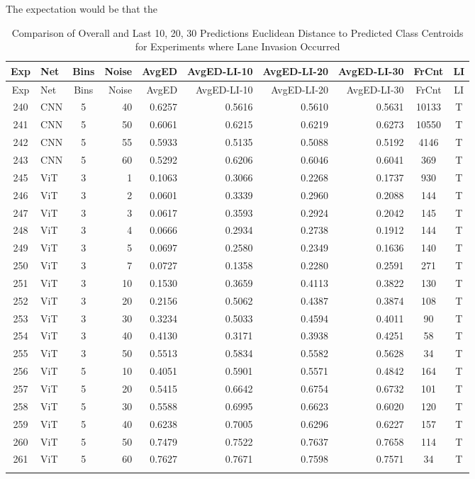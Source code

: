 The expectation would be that the



\begin{longtable}{@{}clcrrrrrcc@{}}
\toprule
Exp & Net & Bins & Noise & AvgED & AvgED-LI-10 & AvgED-LI-20 & AvgED-LI-30 & FrCnt & LI \\
\midrule
\endfirsthead
\toprule
Exp & Net & Bins & Noise & AvgED & AvgED-LI-10 & AvgED-LI-20 & AvgED-LI-30 & FrCnt & LI \\
\midrule
\endhead
240 & CNN & 5 & 40 & 0.6257 & 0.5616 & 0.5610 & 0.5631 & 10133 & T \\
241 & CNN & 5 & 50 & 0.6061 & 0.6215 & 0.6219 & 0.6273 & 10550 & T \\
242 & CNN & 5 & 55 & 0.5933 & 0.5135 & 0.5088 & 0.5192 & 4146 & T \\
243 & CNN & 5 & 60 & 0.5292 & 0.6206 & 0.6046 & 0.6041 & 369 & T \\
245 & ViT & 3 & 1 & 0.1063 & 0.3066 & 0.2268 & 0.1737 & 930 & T \\
246 & ViT & 3 & 2 & 0.0601 & 0.3339 & 0.2960 & 0.2088 & 144 & T \\
247 & ViT & 3 & 3 & 0.0617 & 0.3593 & 0.2924 & 0.2042 & 145 & T \\
248 & ViT & 3 & 4 & 0.0666 & 0.2934 & 0.2738 & 0.1912 & 144 & T \\
249 & ViT & 3 & 5 & 0.0697 & 0.2580 & 0.2349 & 0.1636 & 140 & T \\
250 & ViT & 3 & 7 & 0.0727 & 0.1358 & 0.2280 & 0.2591 & 271 & T \\
251 & ViT & 3 & 10 & 0.1530 & 0.3659 & 0.4113 & 0.3822 & 130 & T \\
252 & ViT & 3 & 20 & 0.2156 & 0.5062 & 0.4387 & 0.3874 & 108 & T \\
253 & ViT & 3 & 30 & 0.3234 & 0.5033 & 0.4594 & 0.4011 & 90 & T \\
254 & ViT & 3 & 40 & 0.4130 & 0.3171 & 0.3938 & 0.4251 & 58 & T \\
255 & ViT & 3 & 50 & 0.5513 & 0.5834 & 0.5582 & 0.5628 & 34 & T \\
256 & ViT & 5 & 10 & 0.4051 & 0.5901 & 0.5571 & 0.4842 & 164 & T \\
257 & ViT & 5 & 20 & 0.5415 & 0.6642 & 0.6754 & 0.6732 & 101 & T \\
258 & ViT & 5 & 30 & 0.5588 & 0.6995 & 0.6623 & 0.6020 & 120 & T \\
259 & ViT & 5 & 40 & 0.6238 & 0.7005 & 0.6296 & 0.6227 & 157 & T \\
260 & ViT & 5 & 50 & 0.7479 & 0.7522 & 0.7637 & 0.7658 & 114 & T \\
261 & ViT & 5 & 60 & 0.7627 & 0.7671 & 0.7598 & 0.7571 & 34 & T \\
\bottomrule
\caption{Comparison of Overall and Last 10, 20, 30 Predictions Euclidean Distance to Predicted Class Centroids for Experiments where Lane Invasion Occurred}
\label{tab:li_ed_comparison}
\end{longtable}


